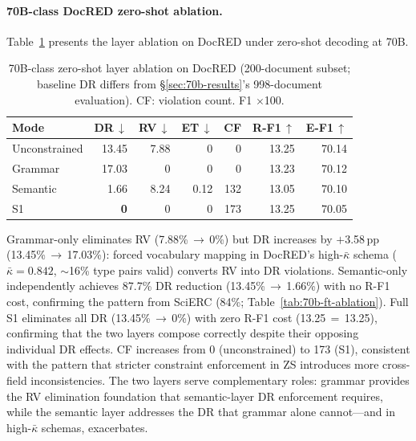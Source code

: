 \paragraph{70B-class DocRED zero-shot ablation.}
\label{app:70b-docred-zs}

Table~\ref{tab:70b-docred-zs-ablation} presents the layer ablation on DocRED under zero-shot decoding at 70B.

\begin{table}[h]
\centering
\small
\setlength{\tabcolsep}{3.6pt}
\begin{tabular}{@{}l rrrr rr@{}}
\toprule
\textbf{Mode}
  & \textbf{DR\,$\downarrow$} & \textbf{RV\,$\downarrow$} & \textbf{ET\,$\downarrow$} & \textbf{CF}
  & \textbf{R-F1\,$\uparrow$} & \textbf{E-F1\,$\uparrow$} \\
\midrule
Unconstrained & 13.45 & 7.88 & 0 & 0    & 13.25 & 70.14 \\
Grammar       & 17.03 & 0    & 0 & 0    & 13.23 & 70.12 \\
Semantic      & 1.66  & 8.24 & 0.12 & 132  & 13.05 & 70.10 \\
S1            & \textbf{0} & 0 & 0 & 173  & 13.25 & 70.05 \\
\bottomrule
\end{tabular}
\caption{70B-class zero-shot layer ablation on DocRED (200-document subset; baseline DR differs from \S\ref{sec:70b-results}'s 998-document evaluation).
CF: violation count. F1 $\times$100.}
\label{tab:70b-docred-zs-ablation}
\end{table}

Grammar-only eliminates RV (7.88\%\,$\to$\,0\%) but DR increases by $+$3.58\,pp (13.45\%\,$\to$\,17.03\%): forced vocabulary mapping in DocRED's high-$\bar{\kappa}$ schema ($\bar{\kappa}{=}0.842$, ${\sim}$16\% type pairs valid) converts RV into DR violations.
Semantic-only independently achieves 87.7\% DR reduction (13.45\%\,$\to$\,1.66\%) with no R-F1 cost, confirming the pattern from SciERC (84\%; Table~\ref{tab:70b-ft-ablation}).
Full S1 eliminates all DR (13.45\%\,$\to$\,0\%) with zero R-F1 cost (13.25\,$=$\,13.25), confirming that the two layers compose correctly despite their opposing individual DR effects.
CF increases from 0 (unconstrained) to 173 (S1), consistent with the pattern that stricter constraint enforcement in ZS introduces more cross-field inconsistencies.
The two layers serve complementary roles: grammar provides the RV elimination foundation that semantic-layer DR enforcement requires, while the semantic layer addresses the DR that grammar alone cannot---and in high-$\bar{\kappa}$ schemas, exacerbates.
